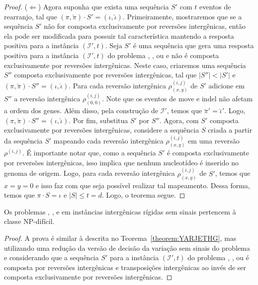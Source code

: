 \begin{proof}
($\Leftarrow$) Agora suponha que exista uma sequência $S'$ com $t$ eventos de rearranjo, tal que $(\pi,\breve\pi) \cdot S' = (\iota,\breve\iota)$. Primeiramente, mostraremos que se a sequência $S'$ não for composta exclusivamente por reversões intergênicas, então ela pode ser modificada para possuir tal característica mantendo a resposta positiva para a instância $(\mathcal{I'},t)$. Seja $S'$ é uma sequência que gera uma resposta positiva para a instância $(\mathcal{I'},t)$ do problema \SbIR{}, \SbIRI{}, \SbIRM{} ou \SbIRMI{} e não é composta exclusivamente por reversões intergênicas. Neste caso, criaremos uma sequência $S''$ composta exclusivamente por reversões intergênicas, tal que  $|S''| < |S'|$ e $(\pi,\breve\pi) \cdot S'' = (\iota,\breve\iota)$. Para cada reversão intergênica $\rho^{(i,j)}_{(x,y)}$ de $S'$ adicione em $S''$ a reversão intergênica $\rho^{(i,j)}_{(0,0)}$. Note que os eventos de move e indel não afetam a ordem dos genes. Além disso, pela construção de $\mathcal{I'}$, temos que $\breve\pi' = \breve\iota'$. Logo, $(\pi,\breve\pi) \cdot S'' = (\iota,\breve\iota)$. Por fim, substitua $S'$ por $S''$. Agora, com $S'$ composta exclusivamente por reversões intergênicas, considere a sequência $S$ criada a partir da sequência $S'$ mapeando cada reversão intergênica $\rho^{(i,j)}_{(x,y)}$ em uma reversão $\rho^{(i,j)}$. É importante notar que, como a sequência $S'$ é composta exclusivamente por reversões intergênicas, isso implica que nenhum nucleotídeo é inserido no genoma de origem. Logo, para cada reversão intergênica $\rho^{(i,j)}_{(x,y)}$ de $S'$, temos que $x=y=0$ e isso faz com que seja possível realizar tal mapeamento. Dessa forma, temos que $\pi \cdot S = \iota$ e $|S| \le t = d $. Logo, o teorema segue.
\end{proof}

\begin{theorem}\label{theorem:RDOZOOIB}
Os problemas \SbIRT, \SbIRTI, \SbIRTM{} e \SbIRTMI{} em instâncias intergênicas rígidas sem sinais pertencem à classe NP-difícil.
\end{theorem}
\begin{proof}
A prova é similar à descrita no Teorema~\ref{theorem:YARJETHG}, mas utilizando uma redução da versão de decisão da variação sem sinais do problema \SbRT{} e considerando que a sequência $S'$ para a instância $(\mathcal{I'},t)$ do problema \SbIRT{}, \SbIRTI{}, \SbIRTM{} ou \SbIRTMI{} é composta por reversões intergênicas e transposições intergênicas ao invés de ser composta exclusivamente por reversões intergênicas.
\end{proof}

